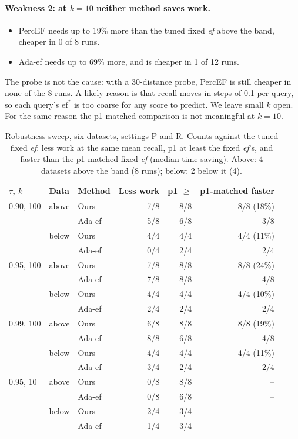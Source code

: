 \documentclass[sigconf,review=false,screen]{acmart}
\newcommand{\ef}{\textit{ef}}
\begin{document}
\paragraph{Weakness 2: at $k = 10$ neither method saves work.}
\begin{itemize}
\item PercEF needs up to 19\% more than the tuned fixed \ef{} above the band, cheaper in 0 of 8 runs.
\item Ada-ef needs up to 69\% more, and is cheaper in 1 of 12 runs.
\end{itemize}
The probe is not the cause: with a 30-distance probe, PercEF is still cheaper in none of the 8 runs.
A likely reason is that recall moves in steps of 0.1 per query, so each query's $\mathrm{ef}^*$ is
too coarse for any score to predict. We leave small $k$ open. For the same reason the p1-matched
comparison is not meaningful at $k = 10$.

\begin{table}[t]
  \caption{Robustness sweep, six datasets, settings P and R. Counts against the tuned fixed \ef{}:
  less work at the same mean recall, p1 at least the fixed \ef{}'s, and faster than the p1-matched
  fixed \ef{} (median time saving). Above: 4 datasets above the band (8 runs); below: 2 below it (4).}
  \label{tab:sweep}
  \centering\footnotesize\setlength{\tabcolsep}{3.5pt}
  \begin{tabular}{lllrrr}
    \toprule
    $\tau$, $k$ & Data & Method & Less work & p1 $\geq$ & p1-matched faster \\
    \midrule
    0.90, 100 & above & Ours   & 7/8 & 8/8 & 8/8 (18\%) \\
              &       & Ada-ef & 5/8 & 6/8 & 3/8 \\
              & below & Ours   & 4/4 & 4/4 & 4/4 (11\%) \\
              &       & Ada-ef & 0/4 & 2/4 & 2/4 \\
    \midrule
    0.95, 100 & above & Ours   & 7/8 & 8/8 & 8/8 (24\%) \\
              &       & Ada-ef & 7/8 & 8/8 & 4/8 \\
              & below & Ours   & 4/4 & 4/4 & 4/4 (10\%) \\
              &       & Ada-ef & 2/4 & 2/4 & 2/4 \\
    \midrule
    0.99, 100 & above & Ours   & 6/8 & 8/8 & 8/8 (19\%) \\
              &       & Ada-ef & 8/8 & 6/8 & 4/8 \\
              & below & Ours   & 4/4 & 4/4 & 4/4 (11\%) \\
              &       & Ada-ef & 3/4 & 2/4 & 2/4 \\
    \midrule
    0.95, 10  & above & Ours   & 0/8 & 8/8 & -- \\
              &       & Ada-ef & 0/8 & 6/8 & -- \\
              & below & Ours   & 2/4 & 3/4 & -- \\
              &       & Ada-ef & 1/4 & 3/4 & -- \\
    \bottomrule
  \end{tabular}
\end{table}
\end{document}
